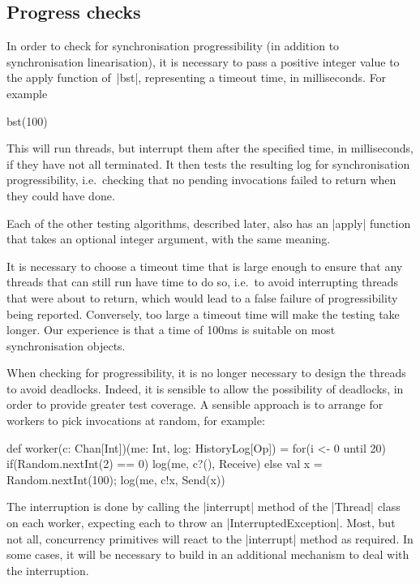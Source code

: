 
\subsection{Progress checks}
\label{sec:progress}

In order to check for synchronisation progressibility (in addition to
synchronisation linearisation), it is necessary to pass a positive integer
value to the apply function of~|bst|, representing a timeout time, in
milliseconds.  For example
%
\begin{scala}
  bst(100)
\end{scala}
%
This will run threads, but interrupt them after the specified time, in
milliseconds, if they have not all terminated.  It then tests the resulting
log for synchronisation progressibility, i.e.~checking that no pending
invocations failed to return when they could have done.

Each of the other testing algorithms, described later, also has an |apply|
function that takes an optional integer argument, with the same meaning. 

It is necessary to choose a timeout time that is large enough to ensure that
any threads that can still run have time to do so, i.e.~to avoid interrupting
threads that were about to return, which would lead to a false failure of
progressibility being reported.  Conversely, too large a timeout time will
make the testing take longer.  Our experience is that a time of 100ms is
suitable on most synchronisation objects.

When checking for progressibility, it is no longer necessary to design the
threads to avoid deadlocks.  Indeed, it is sensible to allow the possibility
of deadlocks, in order to provide greater test coverage.  A sensible approach
is to arrange for workers to pick invocations at random, for example:
%
\begin{scala}
  def worker(c: Chan[Int])(me: Int, log: HistoryLog[Op]) = {
    for(i <- 0 until 20)
      if(Random.nextInt(2) == 0) log(me, c?(), Receive)
      else{ val x = Random.nextInt(100); log(me, c!x, Send(x)) }
  }
\end{scala}

The interruption is done by calling the |interrupt| method of the |Thread|
class on each worker, expecting each to throw an |InterruptedException|.
Most, but not all, concurrency primitives will react to the |interrupt| method
as required.  In some cases, it will be necessary to build in an additional
mechanism to deal with the interruption.   


